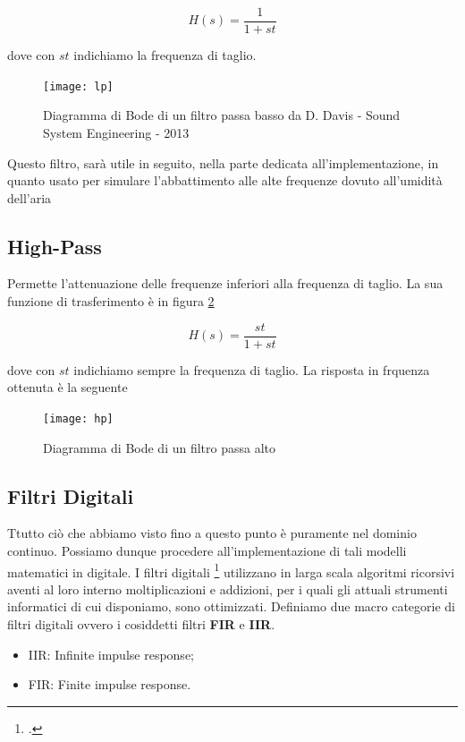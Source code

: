 \begin{equation}
H(s)=\frac{1}{1+st}
\end{equation}

dove con $st$ indichiamo la frequenza di taglio.

\begin{figure}[h]
\centering
\texttt{[image: lp]}
\caption{Diagramma di Bode di un filtro passa basso \newline \scriptsize{ da D. Davis - Sound System Engineering - 2013}}
\label{fig:lp}
\end{figure}

Questo filtro, sarà utile in seguito, nella parte dedicata all'implementazione, in quanto 
usato per simulare l'abbattimento alle alte frequenze dovuto all'umidità dell'aria

\subsection{High-Pass}

Permette l’attenuazione delle frequenze inferiori alla frequenza di taglio.
La sua funzione di trasferimento è in figura \ref{fig:hp}

\begin{equation}
H(s)=\frac{st}{1+st}
\end{equation}

dove con $st$ indichiamo sempre la frequenza di taglio.
La risposta in frquenza ottenuta è la seguente

\begin{figure}[htp]
\centering
\texttt{[image: hp]}
\caption{Diagramma di Bode di un filtro passa alto}
\label{fig:hp}
\end{figure}

\subsection{Filtri Digitali}

Ttutto ciò che abbiamo visto fino a questo punto è puramente nel dominio
continuo. Possiamo dunque procedere all’implementazione di tali modelli
matematici in digitale. I filtri digitali \footcite{ld:book} utilizzano in larga scala algoritmi
ricorsivi aventi al loro interno moltiplicazioni e addizioni, per i quali gli
attuali strumenti informatici di cui disponiamo, sono ottimizzati. Definiamo
due macro categorie di filtri digitali ovvero i cosiddetti filtri \textbf{FIR}
e \textbf{IIR}.

\begin{itemize}
\item IIR: Infinite impulse response;
\item FIR: Finite impulse response.
\end{itemize}

